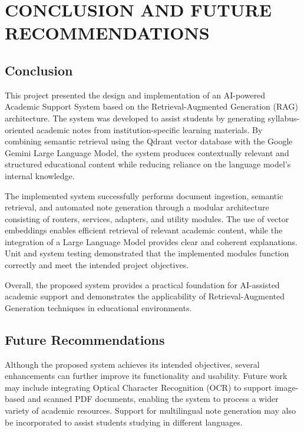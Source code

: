 \chapter{CONCLUSION AND FUTURE RECOMMENDATIONS}

\section{Conclusion}

This project presented the design and implementation of an AI-powered Academic Support System based on the Retrieval-Augmented Generation (RAG) architecture. The system was developed to assist students by generating syllabus-oriented academic notes from institution-specific learning materials. By combining semantic retrieval using the Qdrant vector database with the Google Gemini Large Language Model, the system produces contextually relevant and structured educational content while reducing reliance on the language model's internal knowledge. \par

The implemented system successfully performs document ingestion, semantic retrieval, and automated note generation through a modular architecture consisting of routers, services, adapters, and utility modules. The use of vector embeddings enables efficient retrieval of relevant academic content, while the integration of a Large Language Model provides clear and coherent explanations. Unit and system testing demonstrated that the implemented modules function correctly and meet the intended project objectives. \par

Overall, the proposed system provides a practical foundation for AI-assisted academic support and demonstrates the applicability of Retrieval-Augmented Generation techniques in educational environments. \par

\section{Future Recommendations}

Although the proposed system achieves its intended objectives, several enhancements can further improve its functionality and usability. Future work may include integrating Optical Character Recognition (OCR) to support image-based and scanned PDF documents, enabling the system to process a wider variety of academic resources. Support for multilingual note generation may also be incorporated to assist students studying in different languages. \par

